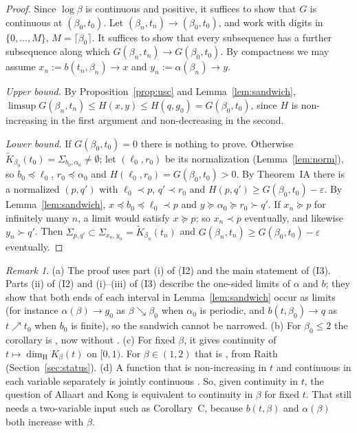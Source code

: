 \documentclass[11pt]{amsart}
\theoremstyle{definition}
\theoremstyle{remark}
\newtheorem{remark}[theorem]{Remark}
\newcommand{\dimH}{\dim_{\mathrm H}}
\newcommand{\lex}{\preccurlyeq}
\newcommand{\gex}{\succcurlyeq}
\newcommand{\K}{\tilde K}
\begin{document}
\begin{proof}
Since $\log\beta$ is continuous and positive, it suffices to show that $G$ is continuous at $(\beta_0,t_0)$. Let $(\beta_n,t_n)\to(\beta_0,t_0)$, and work with digits in $\{0,\dots,M\}$, $M=\lceil\beta_0\rceil$. It suffices to show that every subsequence has a further subsequence along which $G(\beta_n,t_n)\to G(\beta_0,t_0)$. By compactness we may assume $x_n:=b(t_n,\beta_n)\to x$ and $y_n:=\alpha(\beta_n)\to y$.

\emph{Upper bound.} By Proposition~\ref{prop:usc} and Lemma~\ref{lem:sandwich}, $\limsup G(\beta_n,t_n)\le H(x,y)\le H(q,g_0)=G(\beta_0,t_0)$, since $H$ is non-increasing in the first argument and non-decreasing in the second.

\emph{Lower bound.} If $G(\beta_0,t_0)=0$ there is nothing to prove. Otherwise $\K_{\beta_0}(t_0)=\Sigma_{b_0,\alpha_0}\ne\emptyset$; let $(\ell_0,r_0)$ be its normalization (Lemma~\ref{lem:norm}), so $b_0\lex\ell_0$, $r_0\lex\alpha_0$ and $H(\ell_0,r_0)=G(\beta_0,t_0)>0$. By Theorem~IA there is a normalized $(p,q')$ with $\ell_0\prec p$, $q'\prec r_0$ and $H(p,q')\ge G(\beta_0,t_0)-\varepsilon$. By Lemma~\ref{lem:sandwich}, $x\lex b_0\lex\ell_0\prec p$ and $y\gex\alpha_0\gex r_0\succ q'$. If $x_n\gex p$ for infinitely many $n$, a limit would satisfy $x\gex p$; so $x_n\prec p$ eventually, and likewise $y_n\succ q'$. Then $\Sigma_{p,q'}\subset\Sigma_{x_n,y_n}=\K_{\beta_n}(t_n)$ and $G(\beta_n,t_n)\ge G(\beta_0,t_0)-\varepsilon$ eventually.
\end{proof}

\begin{remark}
(a) The proof uses part (i) of (I2) and the main statement of (I3). Parts (ii) of (I2) and (i)--(iii) of (I3) describe the one-sided limits of $\alpha$ and $b$; they show that both ends of each interval in Lemma~\ref{lem:sandwich} occur as limits (for instance $\alpha(\beta)\to g_0$ as $\beta\searrow\beta_0$ when $\alpha_0$ is periodic, and $b(t,\beta_0)\to q$ as $t\nearrow t_0$ when $b_0$ is finite), so the sandwich cannot be narrowed.
(b) For $\beta_0\le2$ the corollary is \cite[Theorem~E]{Nem26}, now without \cite[Theorem~1.4]{LSZ}.
(c) For fixed $\beta$, it gives continuity of $t\mapsto\dimH K_\beta(t)$ on $[0,1)$. For $\beta\in(1,2)$ that is \cite[Proposition~2.5]{KKLL}, from Raith (Section~\ref{sec:status}).
(d) A function that is non-increasing in $t$ and continuous in each variable separately is jointly continuous \cite[remark after Theorem~E]{Nem26}. So, given continuity in $t$, the question of Allaart and Kong is equivalent to continuity in $\beta$ for fixed $t$. That still needs a two-variable input such as Corollary~C, because $b(t,\beta)$ and $\alpha(\beta)$ both increase with $\beta$.
\end{remark}
\end{document}
